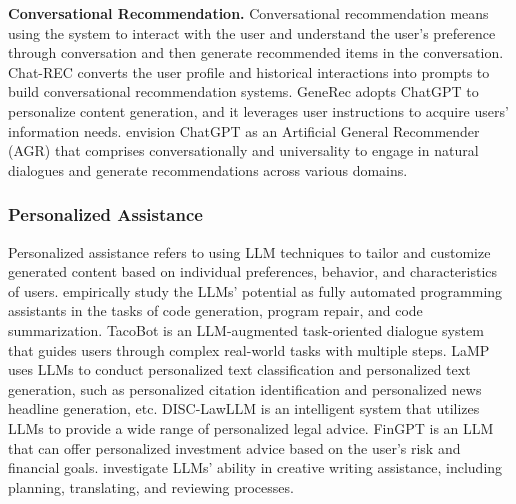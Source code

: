 \documentclass[11pt]{article}
\renewcommand\paragraph[1]{\vspace{0.05in} \noindent \textbf{#1.}}
\begin{document}
\paragraph{Conversational Recommendation}
Conversational recommendation means using the system to interact with the user and understand the user's preference through conversation and then generate recommended items in the conversation. Chat-REC \cite{gao2023chat} converts the user profile and historical interactions into prompts to build conversational recommendation systems. GeneRec \cite{wang2023generative} adopts ChatGPT to
personalize content generation, and it leverages user instructions to acquire users’ information needs. \citet{lin2023sparks} envision ChatGPT as an Artificial General Recommender (AGR) that comprises conversationally and universality to engage in natural dialogues and generate recommendations across various domains.

\subsubsection{Personalized Assistance}
Personalized assistance refers to using LLM techniques to tailor and customize generated content based on individual preferences, behavior, and characteristics of users. \citet{tian2023chatgpt} empirically study the LLMs' potential as fully automated programming assistants in the tasks of code generation, program repair, and code summarization. TacoBot \cite{mo2023roll} is an LLM-augmented task-oriented dialogue system that guides users through complex real-world tasks with multiple steps. LaMP \cite{salemi2023lamp} uses LLMs to conduct personalized text classification and personalized text generation, such as personalized citation identification and personalized news headline generation, etc. DISC-LawLLM \cite{yue2023disc} is an intelligent system that utilizes LLMs to provide a wide range of personalized legal advice. FinGPT \cite{liu2023fingpt} is an LLM that can offer personalized investment advice based on the user's risk and financial goals. \citet{chakrabarty2023creativity} investigate LLMs' ability in creative writing assistance, including planning, translating, and reviewing processes.
\end{document}
